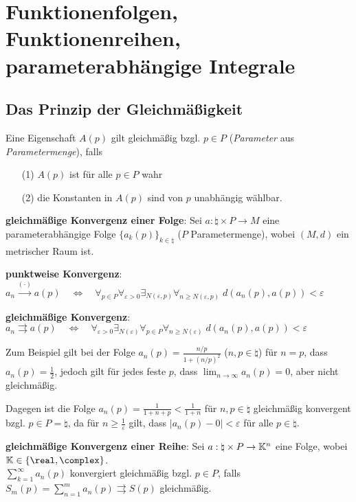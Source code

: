 \chapter{%
    Funktionenfolgen, Funktionenreihen, parameterabhängige Integrale%
}

\section{%
    Das Prinzip der Gleichmäßigkeit%
}

Eine Eigenschaft $A(p)$ gilt gleichmäßig bzgl. $p \in P$
(\emph{Parameter} aus \emph{Parametermenge}), falls
\begin{enumerate}
    \item[(1)] $A(p)$ ist für alle $p \in P$ wahr
    \item[(2)] die Konstanten in $A(p)$ sind von $p$ unabhängig wählbar.
\end{enumerate}

\linie

\textbf{gleichmäßige Konvergenz einer Folge}:
Sei $a: \natural \times P \rightarrow M$ eine parameterabhängige Folge
$\{a_k(p)\}_{k \in \natural}$ ($P$ Parametermenge),
wobei $(M,d)$ ein metrischer Raum ist.

\textbf{punktweise Konvergenz}: $a_n \xrightarrow{(\cdot)} a(p)
\quad\Leftrightarrow\quad \forall_{p \in P} \forall_{\varepsilon > 0}
\exists_{N(\varepsilon, p)} \forall_{n \ge N(\varepsilon, p)}\;
d(a_n(p), a(p)) < \varepsilon$

\textbf{gleichmäßige Konvergenz}: $a_n \rightrightarrows a(p)
\quad\Leftrightarrow\quad \forall_{\varepsilon > 0} \exists_{N(\varepsilon)}
\forall_{p \in P} \forall_{n \ge N(\varepsilon)}\;
d(a_n(p), a(p)) < \varepsilon$

Zum Beispiel gilt bei der Folge $a_n(p) = \frac{n/p}{1 + (n / p)^2}$
($n, p \in \natural$) für $n = p$, dass $a_n(p) = \frac{1}{2}$,
jedoch gilt für jedes feste $p$, dass $\lim_{n \to \infty} a_n(p) = 0$,
aber nicht gleichmäßig.

Dagegen ist die Folge $a_n(p) = \frac{1}{1 + n + p} < \frac{1}{1 + n}$
für $n, p \in \natural$ gleichmäßig konvergent bzgl. $p \in P = \natural$,
da für $n \ge \frac{1}{\varepsilon}$ gilt, dass
$|a_n(p) - 0| < \varepsilon$ für alle $p \in \natural$.

\linie

\textbf{gleichmäßige Konvergenz einer Reihe}:
Sei $a: \natural \times P \rightarrow \mathbb{K}^n$ eine Folge,
wobei $\field \in \{\real, \complex\}$. \\
$\sum_{k=1}^\infty a_n(p)$ konvergiert gleichmäßig bzgl. $p \in P$,
falls $S_m(p) = \sum_{n=1}^m a_n(p) \rightrightarrows S(p)$ gleichmäßig.

